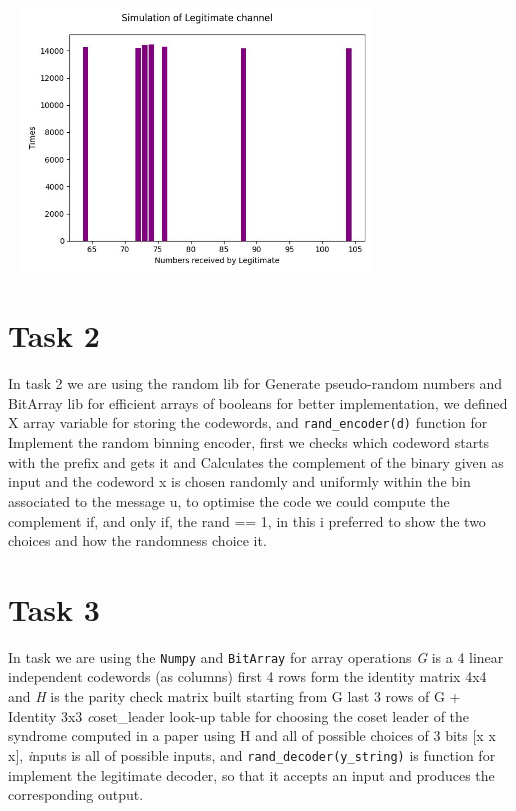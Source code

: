 \documentclass{report}
\begin{document}
 \includegraphics[width=10cm,height=7cm]{2}
  \section*{Task 2}
  In task 2 we are using the random lib for Generate pseudo-random numbers and BitArray lib for efficient arrays of booleans for better implementation, we defined X array variable for storing the codewords, and {\tt rand\_encoder(d)} function for Implement the random binning encoder, first we checks which codeword starts with the prefix and gets it and Calculates the complement of the binary given as input and the codeword x is chosen randomly and uniformly within the bin associated to the message u, to optimise the code we could compute the complement if, and only if, the rand == 1, in this i preferred to show the two choices and how the randomness choice it.
\section*{Task 3}
In task we are using the {\tt Numpy} and {\tt BitArray} for array operations {\textit G}  is a 4 linear independent codewords (as columns)
first 4 rows form the identity matrix 4x4 and {\textit H} is the parity check matrix built starting from G last 3 rows of G + Identity 3x3 {\textit coset\_leader} look-up table for choosing the coset leader of the syndrome computed in a paper using H and all of possible choices of 3 bits [x x x], {\textit inputs} is all of possible inputs, and {\tt rand\_decoder(y\_string)} is function for implement the legitimate decoder, so that it accepts an
input and produces the corresponding output.
\end{document}
